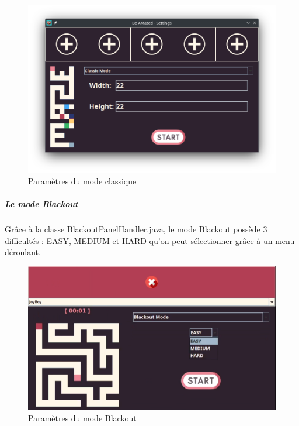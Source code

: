 \begin{figure}[h!]
    \centering
    \includegraphics[scale=0.5]{ressources/Implementation/Labyrinthe/Controleur/SettingsMenu_ClassicMode.png}
    \caption{Paramètres du mode classique}
    \label{fig:ClassicMode}
\end{figure}
\FloatBarrier

\subparagraph*{Le mode Blackout}

Grâce à la classe BlackoutPanelHandler.java, le mode Blackout possède 3 difficultés : EASY, MEDIUM et HARD qu'on peut sélectionner grâce à un menu déroulant.

\begin{figure}[h!]
    \centering
    \includegraphics[scale=0.5]{ressources/Implementation/Labyrinthe/Controleur/SettingsMenu_BlackoutMode_Difficulty.png}
    \caption{Paramètres du mode Blackout}
    \label{fig:BlackoutModeDifficulty}
\end{figure}
\FloatBarrier

